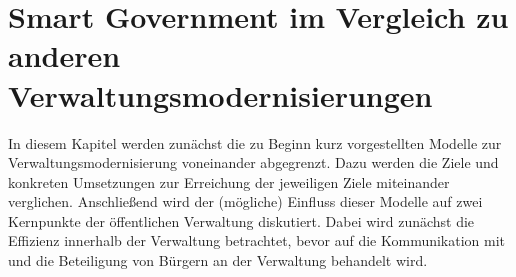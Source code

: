 \section{Smart Government im Vergleich zu anderen Verwaltungsmodernisierungen}
In diesem Kapitel werden zunächst die zu Beginn kurz vorgestellten Modelle zur Verwaltungsmodernisierung voneinander abgegrenzt.
Dazu werden die Ziele und konkreten Umsetzungen zur Erreichung der jeweiligen Ziele miteinander verglichen.
Anschließend wird der (mögliche) Einfluss dieser Modelle auf zwei Kernpunkte der öffentlichen Verwaltung diskutiert.
Dabei wird zunächst die Effizienz innerhalb der Verwaltung betrachtet, bevor auf die Kommunikation mit und die Beteiligung von Bürgern an der Verwaltung behandelt wird.



